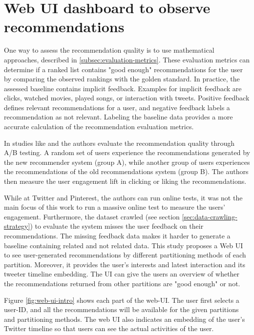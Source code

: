 \section{Web UI dashboard to observe recommendations}
\label{sec:web-ui}
One way to assess the recommendation quality is to use mathematical approaches, described in \ref{subsec:evaluation-metrics}. These evaluation metrics can determine if a ranked list contains "good enough" recommendations for the user by comparing the observed rankings with the golden standard. In practice, the assessed baseline contains implicit feedback. Examples for implicit feedback are clicks, watched movies, played songs, or interaction with tweets. Positive feedback defines relevant recommendations for a user, and negative feedback labels a recommendation as not relevant. Labeling the baseline data provides a more accurate calculation of the recommendation evaluation metrics.


In studies like \cite{eksombatchaiPixieSystemRecommending2018} and \cite{goelWhoToFollowSystemTwitter2015} the authors evaluate the recommendation quality through A/B testing. A random set of users experience the recommendations generated by the new recommender system (group A), while another group of users experiences the recommendations of the old recommendations system (group B). The authors then measure the user engagement lift in clicking or liking the recommendations. 


While at Twitter and Pinterest, the authors can run online tests, it was not the main focus of this work to run a massive online test to measure the users' engagement. Furthermore, the dataset crawled (see section \ref{sec:data-crawling-strategy}) to evaluate the system misses the user feedback on their recommendations. The missing feedback data makes it harder to generate a baseline containing related and not related data. This study proposes a Web UI to see user-generated recommendations by different partitioning methods of each partition. Moreover, it provides the user's interests and latest interaction and its tweeter timeline embedding. The UI can give the users an overview of whether the recommendations returned from other partitions are "good enough" or not.


Figure \ref{fig:web-ui-intro} shows each part of the web-UI. The user first selects a user-ID, and all the recommendations will be available for the given partitions and partitioning methods. The web UI also indicates an embedding of the user's Twitter timeline so that users can see the actual activities of the user. 

